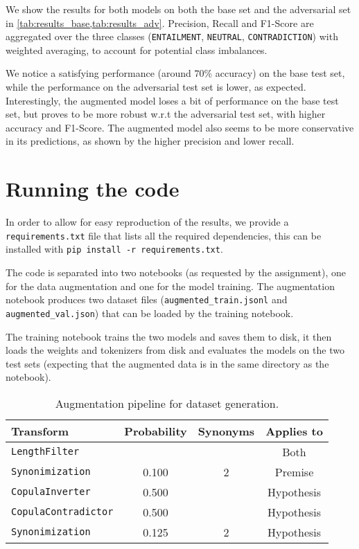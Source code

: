 \documentclass[10pt]{article}
\begin{document}
We show the results for both models on both the base set and the adversarial set in \cref{tab:results_base,tab:results_adv}.
Precision, Recall and F1-Score are aggregated over the three classes (\texttt{ENTAILMENT}, \texttt{NEUTRAL}, \texttt{CONTRADICTION}) with
weighted averaging, to account for potential class imbalances.

We notice a satisfying performance (around $70\%$ accuracy) on the base test set, while the performance on the adversarial test set is lower, as expected. Interestingly,
the augmented model loses a bit of performance on the base test set, but proves to be more robust w.r.t the adversarial test set, with higher accuracy and F1-Score. The
augmented model also seems to be more conservative in its predictions, as shown by the higher precision and lower recall.


\section{Running the code}

In order to allow for easy reproduction of the results, we provide a \texttt{requirements.txt} file that lists all the required dependencies,
this can be installed with \texttt{pip install -r requirements.txt}.

The code is separated into two notebooks (as requested by the assignment), one for the data augmentation and one for the model training. The augmentation
notebook produces two dataset files (\texttt{augmented\_train.jsonl} and \texttt{augmented\_val.json}) that can be loaded by the training notebook.

The training notebook trains the two models and saves them to disk, it then loads the weights and tokenizers from disk and evaluates the models on the
two test sets (expecting that the augmented data is in the same directory as the notebook).


\begin{table*}
      \centering
      \caption{Augmentation pipeline for dataset generation.}
      \label{tab:pipeline}
      \begin{tabularx}{0.70\linewidth}{|X|c|c|c|}
            \hline
            Transform                   & Probability & Synonyms & Applies to \\
            \hline
            \hline
            \texttt{LengthFilter}       &             &          & Both       \\
            \texttt{Synonimization}     & 0.100       & 2        & Premise    \\
            \texttt{CopulaInverter}     & 0.500       &          & Hypothesis \\
            \texttt{CopulaContradictor} & 0.500       &          & Hypothesis \\
            \texttt{Synonimization}     & 0.125       & 2        & Hypothesis \\
            \hline
      \end{tabularx}
\end{table*}
\end{document}

